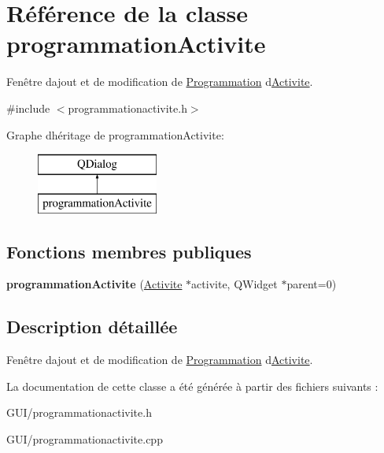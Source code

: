\hypertarget{classprogrammation_activite}{}\section{Référence de la classe programmation\+Activite}
\label{classprogrammation_activite}


Fenêtre d\textquotesingle{}ajout et de modification de \hyperlink{class_programmation}{Programmation} d\textquotesingle{}\hyperlink{class_activite}{Activite}.  




{\ttfamily \#include $<$programmationactivite.\+h$>$}

Graphe d\textquotesingle{}héritage de programmation\+Activite\+:\begin{figure}[H]
\begin{center}
\leavevmode
\includegraphics[height=2.000000cm]{classprogrammation_activite}
\end{center}
\end{figure}
\subsection*{Fonctions membres publiques}
\begin{DoxyCompactItemize}
\item 
\hypertarget{classprogrammation_activite_a10b94d6e981fa26f875ebdf464395148}{}{\bfseries programmation\+Activite} (\hyperlink{class_activite}{Activite} $\ast$activite, Q\+Widget $\ast$parent=0)\label{classprogrammation_activite_a10b94d6e981fa26f875ebdf464395148}

\end{DoxyCompactItemize}


\subsection{Description détaillée}
Fenêtre d\textquotesingle{}ajout et de modification de \hyperlink{class_programmation}{Programmation} d\textquotesingle{}\hyperlink{class_activite}{Activite}. 

La documentation de cette classe a été générée à partir des fichiers suivants \+:\begin{DoxyCompactItemize}
\item 
G\+U\+I/programmationactivite.\+h\item 
G\+U\+I/programmationactivite.\+cpp\end{DoxyCompactItemize}
